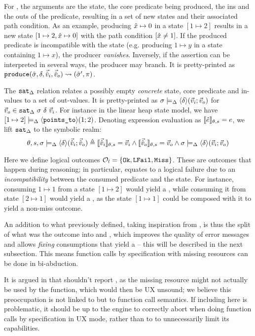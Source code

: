 For \produce{}, the arguments are the state, the core predicate being produced, the ins and the outs of the predicate, resulting in a set of new states and their associated path condition. As an example, producing $\hat{x} \mapsto 0$ in a state $[1 \mapsto 2]$ results in a new state $[1\mapsto 2, \hat{x} \mapsto 0]$ with the path condition $[\hat{x} \neq 1]$. If the produced predicate is incompatible with the state (e.g. producing $1 \mapsto y$ in a state containing $1 \mapsto x$), the producer \emph{vanishes}. Inversely, if the assertion can be interpreted in several ways, the producer may branch. It is pretty-printed as $\texttt{produce}(\hat{\sigma},\delta,\vec{\hat{v}}_i,\vec{\hat{v}}_o)\rightsquigarrow (\hat{\sigma}', \pi)$.

The $\texttt{sat}_{\Delta}$ relation relates a possibly empty \emph{concrete} state, core predicate and in-values to a set of out-values. It is pretty-printed as $\sigma \models_{\Delta} \left<\delta\right>\!(\vec{v}_i;\vec{v}_o)$ for $\vec{v}_o \in \texttt{sat}_{\Delta}~\sigma~\delta~\vec{v}_i$. For instance in the linear heap state model, we have $[ 1 \mapsto 2 ] \models_{\Delta} \left<\texttt{points\_to}\right>\!(1;2)$. Denoting expression evaluation as $\llbracket\hat{e}\rrbracket_{\theta,s}=e$, we lift $\texttt{sat}_{\Delta}$ to the symbolic realm:
\begin{align*}
	\theta,s,\sigma\models_{\Delta} \left<\delta\right>\!(\vec{\hat{v}}_i;\vec{\hat{v}}_o) \triangleq \llbracket\vec{\hat{v}}_i\rrbracket_{\theta,s}=\vec{v}_i \land \llbracket\vec{\hat{v}}_o\rrbracket_{\theta,s}=\vec{v}_o \land \sigma\models_{\Delta} \left<\delta\right>\!(\vec{v}_i;\vec{v}_o)
\end{align*}

Here we define logical outcomes ${\cal O}_l = \{\texttt{Ok}, \texttt{LFail}, \texttt{Miss} \}$. These are outcomes that happen during reasoning; in particular, \LFail{} equates to a logical failure due to an \emph{incompatibility} between the consumed predicate and the state. For instance, consuming $1 \mapsto 1$ from a state $[1 \mapsto 2]$ would yield a \LFail{}, while consuming it from state $[2 \mapsto 1]$ would yield a \Miss{}, as the state $[1\mapsto 1]$ could be composed with it to yield a non-miss outcome.

An addition to what \cite{cse2} previously defined, taking inspiration from \cite{sacha-phd}, is thus the split of what was the  outcome into \LFail{} and \Miss{}, which improves the quality of error messages and allows \emph{fixing} consumptions that yield a \Miss{} -- this will be described in the next subsection. This means function calls by specification with missing resources can be done in bi-abduction.

\begin{remark}
	It is argued in \cite{cse1} that \consume{} shouldn't report \Miss, as the missing resource might not actually be used by the function, which would then be UX unsound; we believe this preoccupation is not linked to \consume{} but to function call semantics. If including \Miss{} here is problematic, it should be up to the engine to correctly abort when doing function calls by specification in UX mode, rather than to \consume{} to unnecessarily limit its capabilities.
\end{remark}

